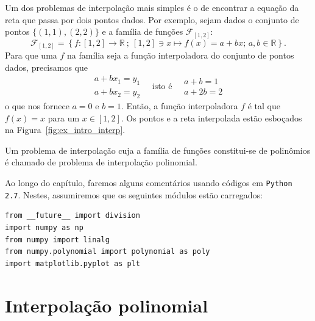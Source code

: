 \begin{ex}\label{ex:intro_interpolacao}
  Um dos problemas de interpolação mais simples é o de encontrar a equação da reta que passa por dois pontos dados. Por exemplo, sejam dados o conjunto de pontos $\{(1, 1), (2, 2)\}$ e a família de funções $\mathcal{F}_{[1,2]}$:
  \begin{equation}
   \mathcal{F}_{[1,2]} = \left\{f:[1,2]\rightarrow \mathbb{R}~;~[1,2]\ni x\mapsto f(x) = a + bx;\,a,b\in\mathbb{R}\right\}.
  \end{equation}
  Para que uma $f$ na família seja a função interpoladora do conjunto de pontos dados, precisamos que
  \begin{equation}
    \begin{array}{l}
      a + bx_1 = y_1\\
      a + bx_2 = y_2
    \end{array}\quad\text{isto é}\quad
    \begin{array}{l}
      a + b = 1\\
      a + 2b = 2
    \end{array}
  \end{equation}
o que nos fornece $a = 0$ e $b = 1$. Então, a função interpoladora $f$ é tal que  $f(x) = x$ para um $x\in[1,2]$. Os pontos e a reta interpolada estão esboçados na Figura~\ref{fig:ex_intro_interp}.
\end{ex}

Um problema de interpolação cuja a família de funções constitui-se de polinômios é chamado de problema de interpolação polinomial.

\ifispython
Ao longo do capítulo, faremos alguns comentários usando códigos em \verb+Python 2.7+. Nestes, assumiremos que os seguintes módulos estão carregados:
\begin{verbatim}
from __future__ import division
import numpy as np
from numpy import linalg
from numpy.polynomial import polynomial as poly
import matplotlib.pyplot as plt
\end{verbatim}
\fi


\section{Interpolação polinomial}

